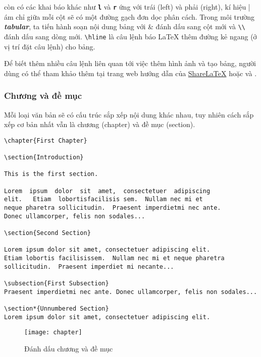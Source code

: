 còn có các khai báo khác như \texttt{\bfseries l} và \texttt{\bfseries r} ứng với trái (left) và phải (right), kí hiệu | ám chỉ giữa
mỗi cột sẽ có một đường gạch đơn dọc phân cách. Trong môi trường \textsl{\bfseries tabular}, ta tiến hành
soạn nội dung bảng với \& đánh dấu sang cột mới và \verb=\\= đánh dấu sang dòng mới. \verb=\hline=
là câu lệnh báo LaTeX thêm đường kẻ ngang (ở vị trí đặt câu lệnh) cho bảng.\par 
Để biết thêm nhiều câu lệnh liên quan tới việc thêm hình ảnh và tạo bảng, người dùng có thể tham khảo
thêm tại trang web hướng dẫn của \href{https://www.sharelatex.com/learn}{ShareLaTeX} hoặc \cite{lamport} và \cite{latex-comp}.\par
\subsubsection*{Chương và đề mục}
Mỗi loại văn bản sẽ có cấu trúc sắp xếp nội dung khác nhau, tuy nhiên cách sắp xếp cơ bản
nhất vẫn là chương (chapter) và đề mục (section).\par
\begin{verbatim}
\chapter{First Chapter}
 
\section{Introduction}
 
This is the first section.
 
Lorem  ipsum  dolor  sit  amet,  consectetuer  adipiscing  
elit.   Etiam  lobortisfacilisis sem.  Nullam nec mi et 
neque pharetra sollicitudin.  Praesent imperdietmi nec ante. 
Donec ullamcorper, felis non sodales...
 
\section{Second Section}
 
Lorem ipsum dolor sit amet, consectetuer adipiscing elit.  
Etiam lobortis facilisissem.  Nullam nec mi et neque pharetra 
sollicitudin.  Praesent imperdiet mi necante...
 
\subsection{First Subsection}
Praesent imperdietmi nec ante. Donec ullamcorper, felis non sodales...
 
\section*{Unnumbered Section}
Lorem ipsum dolor sit amet, consectetuer adipiscing elit. 
\end{verbatim}
\begin{figure}[H]
 \centering
 \texttt{[image: chapter]}
 \caption{Đánh dấu chương và đề mục}
 \label{fig:chapter}
\end{figure}

